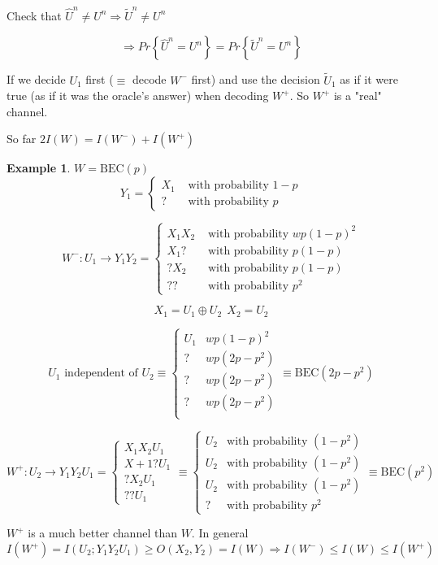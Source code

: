 \documentclass[twoside]{article}
\theoremstyle{definition} %
\newtheorem{example}{Example}
\renewcommand{\Pr}[1]{Pr\left\{#1\right\}}
\begin{document}
Check that $\hat U^n \not = U^n \Rightarrow \tilde U^n \not = U^n$

\[
  \Rightarrow \Pr{\hat U ^n = U^n} = \Pr{\tilde U^n = U^n}
\]

If we decide $U_1$ first ($\equiv$ decode $W^-$ first) and use the decision $\tilde U_1$ as if it were true (as if it was the oracle's answer) when decoding $W^+$. So $W^+$ is a "real" channel.

So far $2I(W) = I(W^-) + I(W^+)$

\begin{example}
  $W=\text{BEC}(p)$
  \[
    Y_1 = \begin{cases}
      X_1 & \text{ with probability } 1 - p\\
      ? & \text{ with probability } p
    \end{cases}
  \]

  \[
    W^-:U_1 \rightarrow Y_1 Y_2 =
    \begin{cases}
      X_1X_2 & \text{ with probability } wp(1-p)^2\\
      X_1 ? & \text{ with probability } p(1-p)\\
      ?X_2 & \text{ with probability } p(1-p)\\
      ? ? & \text{ with probability } p^2
    \end{cases}
  \]

  \[
    X_1 = U_1 \oplus U_2~~X_2=U_2
  \]

  \[
    U_1 \text{ independent of } U_2 \equiv \begin{cases}
      U_1&wp(1-p)^2\\
      ?&wp(2p-p^2)\\
      ?&wp(2p-p^2)\\
      ?&wp(2p-p^2)\\
    \end{cases} \equiv \text{BEC}(2p - p^2)
  \]

  \[
    W^+:U_2 \rightarrow Y_1Y_2U_1 = \begin{cases}
      X_1X_2U_1\\
      X+1 ? U_1\\
      ?X_2 U_1\\
      ??U_1
    \end{cases}
    \equiv
    \begin{cases}
      U_2& \text{with probability } (1-p^2)\\
      U_2& \text{with probability } (1-p^2)\\
      U_2& \text{with probability } (1-p^2)\\
      ?& \text{with probability } p^2
    \end{cases}
    \equiv
    \text{BEC}(p^2)
  \]

  $W^+$ is a much better channel than $W$. In general
  \[
    I(W^+) = I(U_2;Y_1Y_2U_1) \geq O(X_2,Y_2) = I(W) \Rightarrow I(W^-) \leq I(W) \leq I(W^+)
  \]
\end{example}
\end{document}

